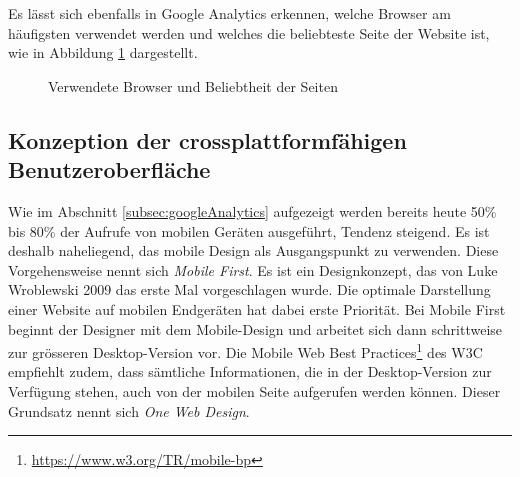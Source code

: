 Es lässt sich ebenfalls in Google Analytics erkennen, welche Browser am häufigsten verwendet werden und welches die beliebteste Seite der Website ist, wie in Abbildung \ref{img:google_browser} dargestellt.

\begin{figure}[h!]
	\centering
	\caption{Verwendete Browser und Beliebtheit der Seiten}
	\label{img:google_browser}
\end{figure}



\subsection{Konzeption der crossplattformfähigen Benutzeroberfläche}
Wie im Abschnitt \ref{subsec:googleAnalytics} aufgezeigt werden bereits heute 50\% bis 80\% der Aufrufe von mobilen Geräten ausgeführt, Tendenz steigend. Es ist deshalb naheliegend, das mobile Design als Ausgangspunkt zu verwenden. Diese Vorgehensweise nennt sich \textit{Mobile First}. Es ist ein Designkonzept, das von Luke Wroblewski 2009 das erste Mal vorgeschlagen wurde. Die optimale Darstellung einer Website auf mobilen Endgeräten hat dabei erste Priorität. Bei Mobile First beginnt der Designer mit dem Mobile-Design und arbeitet sich dann schrittweise zur grösseren Desktop-Version vor. Die \flqq Mobile Web Best Practices\frqq \footnote{ \url{https://www.w3.org/TR/mobile-bp}} des W3C empfiehlt zudem, dass sämtliche Informationen, die in der Desktop-Version zur Verfügung stehen, auch von der mobilen Seite aufgerufen werden können. Dieser Grundsatz nennt sich \textit{One Web Design}.

